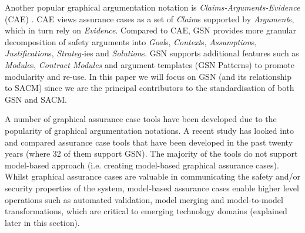 Another popular graphical argumentation notation is \textit{Claims-Arguments-Evidence} (CAE) \cite{bishop2000methodology}. 
CAE views assurance cases as a set of \textit{Claim}s supported by \textit{Argument}s, which in turn rely on \textit{Evidence}.
Compared to CAE, GSN provides more granular decomposition of safety arguments into \textit{Goal}s, \textit{Context}s, \textit{Assumption}s, \textit{Justification}s, \textit{Strateg-}ies and \textit{Solution}s. GSN supports additional features such as \textit{Module}s, \textit{Contract Modules} and argument templates (GSN Patterns) to promote modularity and re-use.
In this paper we will focus on GSN (and its relationship to SACM) since we are the principal contributors to the standardisation of both GSN and SACM.

A number of graphical assurance case tools have been developed due to the popularity of graphical argumentation notations. 
A recent study \cite{maksimov2018} has looked into and compared assurance case tools that have been developed in the past twenty years (where 32 of them support GSN). 
The majority of the tools do not support model-based approach (i.e. creating model-based graphical assurance cases).
Whilst graphical assurance cases are valuable in communicating the safety and/or security properties of the system, model-based assurance cases enable higher level operations such as automated validation, model merging and model-to-model transformations, which are critical to emerging technology domains (explained later in this section). 
%


